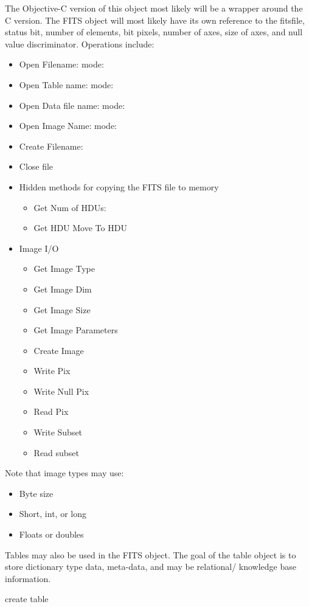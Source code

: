 \documentclass[11pt]{article}
\begin{document}
The Objective-C version of this object most likely will be a wrapper around the C version.  The FITS object will most likely have its own reference to the fitsfile, status bit, number of elements, bit pixels, number of axes, size of axes, and null value discriminator.  Operations include:
\begin{itemize}
\item Open Filename: mode: 
\item Open Table name: mode:
\item Open Data file name:  mode:
\item Open Image Name:  mode:
\item Create Filename: 
\item Close file
\item Hidden methods for copying the FITS file to memory
\begin{itemize}
\item Get Num of HDUs:
\item Get HDU Move To HDU
\end{itemize}
\item Image I/O 
\begin{itemize}
\item Get Image Type
\item Get Image Dim
\item Get Image Size
\item Get Image Parameters
\item Create Image
\item Write Pix
\item Write Null Pix
\item Read Pix
\item Write Subset
\item Read subset
\end{itemize}

\end{itemize}


Note that image types may use:
\begin{itemize}
\item Byte size 
\item Short, int, or long
\item Floats or doubles
\end{itemize}

 Tables may also be used in the FITS object.  The goal of the table object is to store dictionary type data, meta-data, and may be relational/ knowledge base information.  
 
 create table
 
\end{document}
